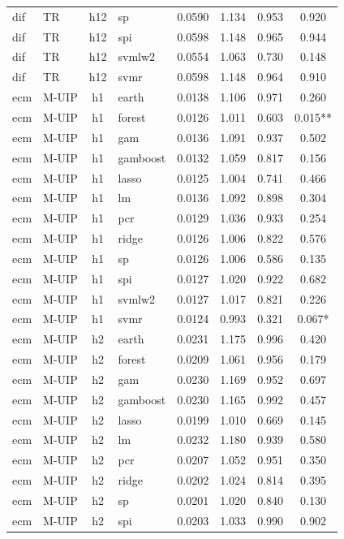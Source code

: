 \begin{ThreePartTable}
\begin{longtable}[t]{llclcccc}
dif & TR & h12 & sp & 0.0590 & 1.134 & 0.953 & 0.920\\
dif & TR & h12 & spi & 0.0598 & 1.148 & 0.965 & 0.944\\
dif & TR & h12 & svmlw2 & 0.0554 & 1.063 & 0.730 & 0.148\\
dif & TR & h12 & svmr & 0.0598 & 1.148 & 0.964 & 0.910\\
\addlinespace
ecm & M-UIP & h1 & earth & 0.0138 & 1.106 & 0.971 & 0.260\\
ecm & M-UIP & h1 & forest & 0.0126 & 1.011 & 0.603 & 0.015**\\
ecm & M-UIP & h1 & gam & 0.0136 & 1.091 & 0.937 & 0.502\\
ecm & M-UIP & h1 & gamboost & 0.0132 & 1.059 & 0.817 & 0.156\\
ecm & M-UIP & h1 & lasso & 0.0125 & 1.004 & 0.741 & 0.466\\
ecm & M-UIP & h1 & lm & 0.0136 & 1.092 & 0.898 & 0.304\\
ecm & M-UIP & h1 & pcr & 0.0129 & 1.036 & 0.933 & 0.254\\
ecm & M-UIP & h1 & ridge & 0.0126 & 1.006 & 0.822 & 0.576\\
ecm & M-UIP & h1 & sp & 0.0126 & 1.006 & 0.586 & 0.135\\
ecm & M-UIP & h1 & spi & 0.0127 & 1.020 & 0.922 & 0.682\\
ecm & M-UIP & h1 & svmlw2 & 0.0127 & 1.017 & 0.821 & 0.226\\
ecm & M-UIP & h1 & svmr & 0.0124 & 0.993 & 0.321 & 0.067*\\
\addlinespace
ecm & M-UIP & h2 & earth & 0.0231 & 1.175 & 0.996 & 0.420\\
ecm & M-UIP & h2 & forest & 0.0209 & 1.061 & 0.956 & 0.179\\
ecm & M-UIP & h2 & gam & 0.0230 & 1.169 & 0.952 & 0.697\\
ecm & M-UIP & h2 & gamboost & 0.0230 & 1.165 & 0.992 & 0.457\\
ecm & M-UIP & h2 & lasso & 0.0199 & 1.010 & 0.669 & 0.145\\
ecm & M-UIP & h2 & lm & 0.0232 & 1.180 & 0.939 & 0.580\\
ecm & M-UIP & h2 & pcr & 0.0207 & 1.052 & 0.951 & 0.350\\
ecm & M-UIP & h2 & ridge & 0.0202 & 1.024 & 0.814 & 0.395\\
ecm & M-UIP & h2 & sp & 0.0201 & 1.020 & 0.840 & 0.130\\
ecm & M-UIP & h2 & spi & 0.0203 & 1.033 & 0.990 & 0.902\\

\end{longtable}
\end{ThreePartTable}

